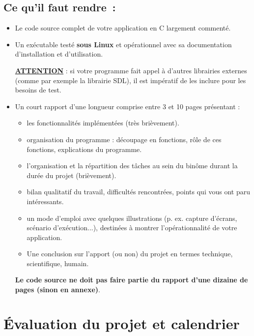 \documentclass[10pt]{article}
\begin{document}
\subsection*{Ce qu'il faut rendre~:}
\begin{itemize}
\item Le code source complet de votre application en C largement commenté.

\item Un exécutable testé \textbf{sous Linux} et opérationnel avec sa documentation d'installation et d'utilisation. 

\underline{\bf ATTENTION} :
si votre programme fait appel à d'autres librairies externes (comme par exemple 
la librairie SDL), il est impératif de les inclure pour les besoins de test. 

\item Un court rapport d'une longueur comprise entre 3 et 10 pages présentant :
  \begin{itemize}
    \item les fonctionnalités implémentées (très brièvement).
    \item organisation du programme : découpage en fonctions, rôle de 
      ces fonctions, explications du programme. 
    \item l'organisation et la répartition des tâches au sein du binôme 
      durant la durée du projet (brièvement).
    \item bilan qualitatif du travail, difficultés rencontrées, points qui 
      vous ont paru intéressants. 
    \item un mode d'emploi avec quelques illustrations (p. ex. capture d'écrans, 
      scénario d'exécution...), destinées à montrer l'opérationnalité 
      de votre application.
    \item Une conclusion sur l'apport (ou non) du projet en termes technique,
      scientifique, humain. 
  \end{itemize}

\textbf{Le code source ne doit pas faire partie du rapport d'une dizaine de pages 
(sinon en annexe)}.
\end{itemize}

\section{Évaluation du projet et calendrier}
\end{document}
